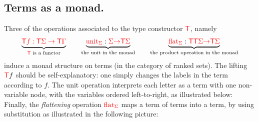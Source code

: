 \subsection{Terms as a monad.} Three of the operations associated to the type constructor ${\color{red}{\mathsf T}}$, namely  
\begin{align*}
        \underbrace{{\color{red}{{\color{red}{\mathsf T}}f : {\color{red}{\mathsf T}}\Sigma \to {\color{red}{\mathsf T}}\Gamma}}}_{\text{${\color{red}{\mathsf T}}$ is a functor}} \qquad  \underbrace{{\color{red}{\mathrm{unit}}}_{\color{red}{\Sigma}} : {\color{red}{\Sigma}} {\color{red}{\to}} {\color{red}{\mathsf T}} {\color{red}{\Sigma}}}_{\text{the unit in the monad}} \qquad  \underbrace{{\color{red}{\mathrm{flat}}}_{\color{red}{\Sigma}} : {\color{red}{\mathsf T}} {\color{red}{\mathsf T}} {\color{red}{\Sigma}} {\color{red}{\to}} {\color{red}{\mathsf T}} {\color{red}{\Sigma}}}_{\text{the product operation in the monad}}
\end{align*}
induce a monad structure on terms (in the category of ranked sets). The lifting ${\color{red}{\mathsf T}} f$ should be self-explanatory: one simply changes the labels in the term according to $f$. The  unit operation interprets each letter as a term with one non-variable node, with the variables ordered left-to-right,  as illustrated below:
Finally, the  \emph{flattening} operation ${\color{red}{\mathrm{flat}}}_{\color{red}{\Sigma}}$ 
        maps a term of terms into a term, by using substitution as illustrated in the following picture:  
    
